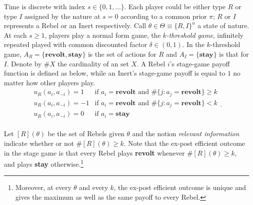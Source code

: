 \documentclass[12pt,letter]{article}
\theoremstyle{definition}
\theoremstyle{remark}
\theoremstyle{claim}
\begin{document}
Time is discrete with index $s\in\{0,1,...\}$. Each player could be either type $R$ or type $I$ assigned by the nature at $s=0$ according to a common prior $\pi$; $R$ or $I$ represents a Rebel or an Inert respectively. Call $\theta\in \Theta\equiv \{R,I\}^n$ a state of nature. At each $s\geq 1$, players play a normal form game, the \textit{$k$-threshold game}, infinitely repeated played with common discounted factor $\delta\in (0,1)$. In the $k$-threshold game, $A_R=\{\textbf{revolt}, \textbf{stay}\}$ is the set of actions for $R$ and $A_I=\{\textbf{stay}\}$ is that for $I$. Denote by $\#X$ the cardinality of an set $X$. A Rebel $i$'s stage-game payoff function is defined as below, while an Inert's stage-game payoff is equal to $1$ no matter how other players play. 
\[   
\begin{array}{ll}
      u_{R}(a_{i},a_{-i})=1 & \text{if $a_{i}=\textbf{revolt}$ and $\#\{j:a_{j}=\textbf{revolt}\}\geq k$} \\
      u_{R}(a_{i},a_{-i})=-1 & \text{if $a_{i}=\textbf{revolt}$ and $\#\{j:a_{j}=\textbf{revolt}\}< k$} \\
      u_{R}(a_{i},a_{-i})=0 & \text{if $a_{i}=\textbf{stay}$} \\
\end{array} 
. \]


Let $[R](\theta)$ be the set of Rebels given $\theta$ and the notion \textit{relevant information} indicate whether or not $\#[R](\theta)\geq k$. Note that the ex-post efficient outcome in the stage game is that every Rebel plays \textbf{revolt} whenever $\#[R](\theta)\geq k$, and plays \textbf{stay} otherwise.\footnote{Moreover, at every $\theta$ and every $k$, the ex-post efficient outcome is unique and gives the maximum as well as the same payoff to every Rebel.} 
\end{document}
